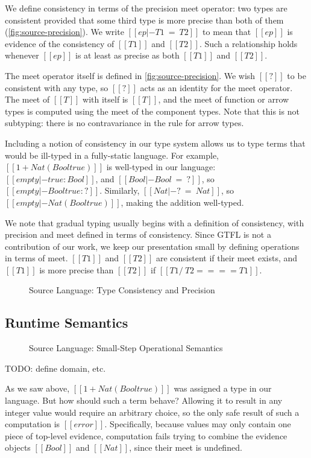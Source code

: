 \documentclass[11pt]{article}
\begin{document}
We define consistency in terms of the precision meet operator: two types
are consistent provided that some third type is more precise than both of them (\autoref{fig:source-precision}).
We write $[[ep |- T1 ~=~ T2]]$ to mean that $[[ep]]$ is evidence of the consistency of $[[T1]]$ and $[[T2]]$.
Such a relationship holds whenever $[[ep]]$ is at least as precise as both $[[T1]]$ and $[[T2]]$.

The meet operator itself is defined in \autoref{fig:source-precision}. We wish $[[?]]$ to be consistent with any type,
so $[[?]]$ acts as an identity for the meet operator. The meet of $[[T]]$ with itself is $[[T]]$, and
the meet of function or arrow types is computed using the meet of the component types.
Note that this is not subtyping: there is no contravariance in the rule for arrow types.

Including a notion of consistency in our type system allows us to type terms that would be ill-typed
in a fully-static language.
For example, $[[1 + {Nat}({Bool} true)]]$ is well-typed in our language: $[[empty |- true : Bool ]]$,
and $[[{Bool} |- Bool ~=~ ?]]$, so $[[empty |- {Bool}true : ? ]]$. Similarly, $[[Nat |- ? ~=~ Nat]]$,
so $[[empty |- {Nat}({Bool}true)]]$, making the addition well-typed.

We note that gradual typing usually begins with a definition of consistency, with precision and meet defined
in terms of consistency. Since GTFL is not a contribution of our work, we keep our presentation small
by defining operations in terms of meet. $[[T1]]$ and $[[T2]]$ are consistent if their meet exists,
and $[[T1]]$ is more precise than $[[T2]]$ if $[[T1 /\ T2 ==== T1]]$.


\begin{figure}[H]
	\ottdefnConsistent{}
	\ottdefnMeet{}
	\caption{Source Language: Type Consistency and Precision}
	\label{fig:source-precision}
\end{figure}

\subsection{Runtime Semantics}

\begin{figure}[H] 
	\ottdefnsSemantics{}
	\caption{Source Language: Small-Step Operational Semantics}
	\label{fig:source-semantics}
\end{figure}

TODO: define domain, etc.

As we saw above, $[[1 + {Nat}({Bool} true)]]$ was assigned a type in our language. But how should such a term behave?
Allowing it to result in any integer value would require an arbitrary choice, so the only safe result
of such a computation is $[[error]]$. Specifically, because values may only contain one piece of top-level evidence, 
computation fails trying to combine the evidence objects $[[Bool]]$ and $[[Nat]]$, since their meet is undefined.
\end{document}
